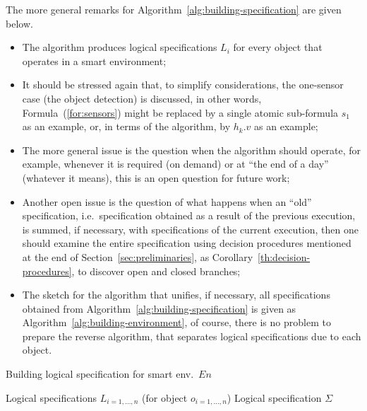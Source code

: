 \documentclass[runningheads,a4paper]{llncs}
\begin{document}
The more general remarks for Algorithm~\ref{alg:building-specification}
are given below.
\begin{itemize}
  \item The algorithm produces logical specifications $L_{i}$ for every object that operates in a smart environment;
  \item It should be stressed again that,
        to simplify considerations, the one-sensor case (the object detection) is discussed,
        in other words, Formula~(\ref{for:sensors}) might be replaced by a single atomic sub-formula $s_1$ as an example,
        or, in terms of the algorithm, by $h_{k}.v$ as an example;
  \item The more general issue is the question when the algorithm should operate,
        for example, whenever it is required (on demand) or at ``the end of a day'' (whatever it means),
        this is an open question for future work;
  \item Another open issue is the question of what happens when an ``old'' specification,
        i.e.\ specification obtained as a result of the previous execution, is
        summed, if necessary, with specifications of the current execution,
        then one should examine the entire specification using decision procedures
        mentioned at the end of Section~\ref{sec:preliminaries},
        as Corollary~\ref{th:decision-procedures},
        to discover open and closed branches;
  \item The sketch for the algorithm that unifies, if necessary,
        all specifications obtained from Algorithm~\ref{alg:building-specification}
        is given as Algorithm~\ref{alg:building-environment},
        of course,
        there is no problem to prepare the reverse algorithm,
        that separates logical specifications due to each object.
\end{itemize}
\begin{algorithm}[htb]
\caption{Building logical specification for smart env.\ $En$}
\label{alg:building-environment}
{\normalsize
\begin{algorithmic}[1]
\algrenewcommand{}
\algrenewcommand{}
\Require Logical specifications $L_{i=1,\ldots,n}$ (for object $o_{i=1,\ldots,n}$)
\Ensure Logical specification $\Sigma$
\EndFor
\EndFor
{}
\end{algorithmic}
}
\end{algorithm}
\end{document}
